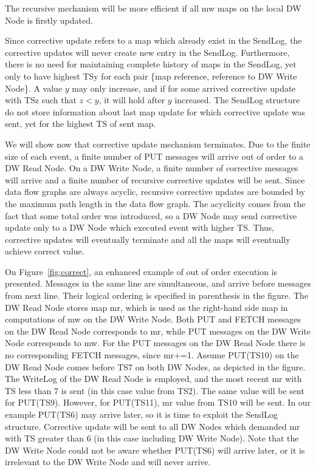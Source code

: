 \documentclass{sig-semester}
\begin{document}
The recursive mechanism will be more efficient if all mw maps on the local DW Node is firstly updated.

Since corrective update refers to a map which already exist in the SendLog, the corrective updates will never create new entry in the SendLog. Furthermore, there is no need for maintaining complete history of maps in the SendLog, yet only to have highest TSy for each pair \{map reference, reference to DW Write Node\}. A value $y$ may only increase, and if for some arrived corrective update with TSz such that $z<y$, it will hold after $y$ increased. The SendLog structure do not store information about last map update for which corrective update was sent, yet for the highest TS of sent map.

We will show now that corrective update mechanism terminates. Due to the finite size of each event, a finite number of PUT messages will arrive out of order to a DW Read Node. On a DW Write Node, a finite number of corrective messages will arrive and a finite number of recursive corrective updates will be sent. Since data flow graphs are always acyclic, recursive corrective updates are bounded by the maximum path length in the data flow graph. The acyclicity comes from the fact that some total order was introduced, so a DW Node may send corrective update only to a DW Node which executed event with higher TS. Thus, corrective updates will eventually terminate and all the maps will eventually achieve correct value.
 
On Figure~\ref{fig:correct}, an enhanced example of out of order execution is presented. Messages in the same line are simultaneous, and arrive before messages from next line. Their logical ordering is specified in parenthesis in the figure. The DW Read Node stores map mr, which is used as the right-hand side map in computations of mw on the DW Write Node. Both PUT and FETCH messages on the DW Read Node corresponds to mr, while PUT messages on the DW Write Node corresponds to mw. For the PUT messages on the DW Read Node there is no corresponding FETCH messages, since mr+=1. Assume PUT(TS10) on the DW Read Node comes before TS7 on both DW Nodes, as depicted in the figure. The WriteLog of the DW Read Node is employed, and the most recent mr with TS less than 7 is sent (in this case value from TS2). The same value will be sent for PUT(TS9). However, for PUT(TS11), mr value from TS10 will be sent. In our example PUT(TS6) may arrive later, so it is time to exploit the SendLog structure. Corrective update will be sent to all DW Nodes which demanded mr with TS greater than 6 (in this case including DW Write Node). Note that the DW Write Node could not be aware whether PUT(TS6) will arrive later, or it is irrelevant to the DW Write Node and will never arrive.
\end{document}

